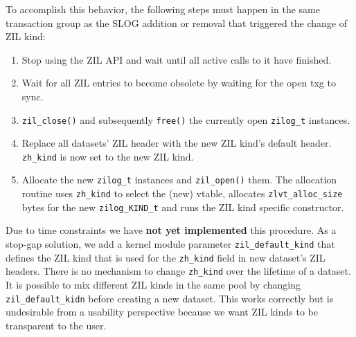 \documentclass[12pt,a4paper,twoside]{book}
\begin{document}
To accomplish this behavior, the following steps must happen in the same transaction group as the SLOG addition or removal that triggered the change of ZIL kind:
\begin{enumerate}[noitemsep]
    \item Stop using the ZIL API and wait until all active calls to it have finished.
    \item Wait for all ZIL entries to become obsolete by waiting for the open txg to sync.
    \item \lstinline{zil_close()} and subsequently \lstinline{free()} the currently open \lstinline{zilog_t} instances.
    \item Replace all datasets' ZIL header with the new ZIL kind's default header.
        \lstinline{zh_kind} is now set to the new ZIL kind.
    \item Allocate the new \lstinline{zilog_t} instances and \lstinline{zil_open()} them.
        The allocation routine uses \lstinline{zh_kind} to select the (new) vtable, allocates \lstinline{zlvt_alloc_size} bytes for the new \lstinline{zilog_KIND_t} and runs the ZIL kind specific constructor.
\end{enumerate}
Due to time constraints we have \textbf{not yet implemented} this procedure.
As a stop-gap solution, we add a kernel module parameter \lstinline{zil_default_kind} that defines the ZIL kind that is used for the \lstinline{zh_kind} field in new dataset's ZIL headers.
There is no mechanism to change \lstinline{zh_kind} over the lifetime of a dataset.
It is possible to mix different ZIL kinds in the same pool by changing \lstinline{zil_default_kidn} before creating a new dataset.
This works correctly but is undesirable from a usability perspective because we want ZIL kinds to be transparent to the user.
\end{document}
